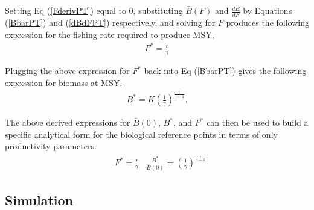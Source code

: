 Setting Eq (\ref{FderivPT}) equal to 0, substituting $\bar B(F)$ and
$\frac{d \bar B}{dF}$ by Equations (\ref{BbarPT}) and (\ref{dBdFPT}) respectively,
and solving for $F$ produces the following expression for the fishing
rate required to produce MSY, %
%
\begin{align}
F^* = \frac{r}{\gamma}%
\end{align}

%
Plugging the above expression for $F^*$ back into Eq (\ref{BbarPT}) gives the
following expression for biomass at MSY,
\begin{align}
B^* = K\left(\frac{1}{\gamma}\right)^{\frac{1}{\gamma-1}} \label{BmsyPT}. %
\end{align}

%
The above derived expressions for $\bar B(0)$, $B^*$, and $F^*$ can then be used to
build a specific analytical form for the biological reference points in terms of only
productivity parameters.
\begin{align}\label{ptRP}
&F^* = \frac{r}{\gamma}
&\frac{B^*}{\bar B(0)} = \left(\frac{1}{\gamma}\right)^{\frac{1}{\gamma-1}}
\end{align}

%
\subsection{Simulation}

